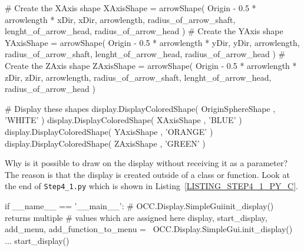 \begin{python}[moreemph={[4], 46, 48},caption={Step4\_1.py - Drawing a coordinate system -- function {\tt CoordinateCrossShape} which is called by function {\tt draw\_coordinates}},label=LISTING_STEP4_1_PY_B]
    # Create the XAxis shape
    XAxisShape = arrowShape(    Origin - 0.5 * arrowlength * xDir, 
                                xDir,
                                arrowlength,
                                radius_of_arrow_shaft,
                                lenght_of_arrow_head,
                                radius_of_arrow_head )
    # Create the YAxis shape
    YAxisShape = arrowShape(    Origin - 0.5 * arrowlength * yDir, 
                                yDir,
                                arrowlength,
                                radius_of_arrow_shaft,
                                lenght_of_arrow_head,
                                radius_of_arrow_head )
    # Create the ZAxis shape
    ZAxisShape = arrowShape(    Origin - 0.5 * arrowlength * zDir, 
                                zDir,
                                arrowlength,
                                radius_of_arrow_shaft,
                                lenght_of_arrow_head,
                                radius_of_arrow_head )
    
    # Display these shapes
    display.DisplayColoredShape( OriginSphereShape , 'WHITE' ) 
    display.DisplayColoredShape( XAxisShape , 'BLUE' ) 
    display.DisplayColoredShape( YAxisShape , 'ORANGE' ) 
    display.DisplayColoredShape( ZAxisShape , 'GREEN' ) 
\end{python}

Why is it possible to draw on the display without receiving it as a parameter?
The reason is that the display is created outside of a class or function.
Look at the end of {\tt Step4\_1.py} which is shown in  Listing~\ref{LISTING_STEP4_1_PY_C}.
%
\begin{python}[moreemph={[4], 46, 48},caption={Step4\_1.py - Creating the display},label=LISTING_STEP4_1_PY_C]
if __name__ == '__main__':
    # OCC.Display.SimpleGuiinit_display() returns multiple
    # values which are assigned here
    display, start_display, add_menu, add_function_to_menu = \
        OCC.Display.SimpleGui.init_display()
...
    start_display()
\end{python}

